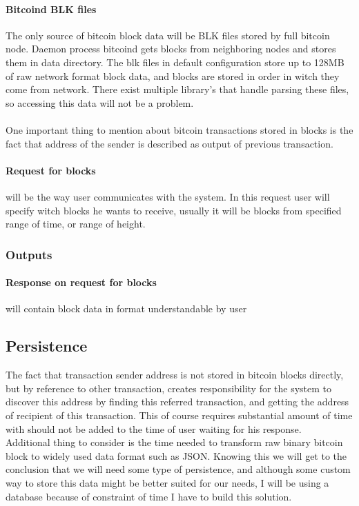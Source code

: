 \documentclass[12pt, en, eng]{mgr}
\begin{document}
\paragraph{Bitcoind BLK files}
The only source of bitcoin block data will be BLK files stored by full bitcoin node. Daemon process bitcoind gets blocks from neighboring nodes and stores them in data directory. The blk files in default configuration store up to 128MB of raw network format block data, and blocks are stored in order in witch they come from network. There exist multiple library's that handle parsing these files, so accessing this data will not be a problem.
\\
\\
One important thing to mention about bitcoin transactions stored in blocks is the fact that address of the sender is described as output of previous transaction.

\paragraph{Request for blocks} will be the way user communicates with the system. In this request user will specify witch blocks he wants to receive, usually it will be blocks from specified range of time, or range of height.

\subsubsection{Outputs}
\paragraph{Response on request for blocks} will contain block data in format understandable by user 


\subsection{Persistence}
The fact that transaction sender address is not stored in bitcoin blocks directly, but by reference to other transaction, creates responsibility for the system to discover this address by finding this referred transaction, and getting the address of recipient of this transaction. This of course requires substantial amount of time with should not be added to the time of user waiting for his response. 
\\
Additional thing to consider is the time needed to transform raw binary bitcoin block to widely used data format such as JSON. Knowing this we will get to the conclusion that we will need some type of persistence, and although some custom way to store this data might be better suited for our needs, I will be using a database because of constraint of time I have to build this solution.
\end{document}
